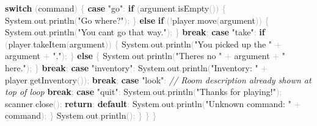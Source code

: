 \documentclass[
  justified,
  openright,
]{tufte-book}
\newcommand{\KeywordTok}[1]{\textcolor{CodeKeyword}{\textbf{#1}}}  %
\newcommand{\StringTok}[1]{\textcolor{CodeString}{#1}}              %
\newcommand{\CommentTok}[1]{\textcolor{CodeComment}{\textit{#1}}}  %
\newcommand{\CodeFuncTok}[1]{\textcolor{CodeKeyword}{#1}}           %
\newcommand{\OperatorTok}[1]{\textcolor{DarkGray}{#1}}              %
\newenvironment{Shaded}{%
  \begin{mdframed}[style=TufteCode]%
}{%
  \end{mdframed}%
}
\begin{document}
\begin{Shaded}
\begin{Highlighting}[]
            \KeywordTok{switch} \OperatorTok{(}command\OperatorTok{)} \OperatorTok{\{}
                \KeywordTok{case} \StringTok{"go"}\OperatorTok{:}
                    \KeywordTok{if} \OperatorTok{(}argument\OperatorTok{.}\CodeFuncTok{isEmpty}\OperatorTok{())} \OperatorTok{\{}
                        System\OperatorTok{.}\CodeFuncTok{out}\OperatorTok{.}\CodeFuncTok{println}\OperatorTok{(}\StringTok{"Go where?"}\OperatorTok{);}
                    \OperatorTok{\}} \KeywordTok{else} \KeywordTok{if} \OperatorTok{(!}player\OperatorTok{.}\CodeFuncTok{move}\OperatorTok{(}argument\OperatorTok{))} \OperatorTok{\{}
                        System\OperatorTok{.}\CodeFuncTok{out}\OperatorTok{.}\CodeFuncTok{println}\OperatorTok{(}\StringTok{"You can\textquotesingle{}t go that way."}\OperatorTok{);}
                    \OperatorTok{\}}
                    \KeywordTok{break}\OperatorTok{;}
                \KeywordTok{case} \StringTok{"take"}\OperatorTok{:}
                    \KeywordTok{if} \OperatorTok{(}player\OperatorTok{.}\CodeFuncTok{takeItem}\OperatorTok{(}argument\OperatorTok{))} \OperatorTok{\{}
                        System\OperatorTok{.}\CodeFuncTok{out}\OperatorTok{.}\CodeFuncTok{println}\OperatorTok{(}\StringTok{"You picked up the "} \OperatorTok{+} argument \OperatorTok{+} \StringTok{"."}\OperatorTok{);}
                    \OperatorTok{\}} \KeywordTok{else} \OperatorTok{\{}
                        System\OperatorTok{.}\CodeFuncTok{out}\OperatorTok{.}\CodeFuncTok{println}\OperatorTok{(}\StringTok{"There\textquotesingle{}s no "} \OperatorTok{+} argument \OperatorTok{+} \StringTok{" here."}\OperatorTok{);}
                    \OperatorTok{\}}
                    \KeywordTok{break}\OperatorTok{;}
                \KeywordTok{case} \StringTok{"inventory"}\OperatorTok{:}
                    System\OperatorTok{.}\CodeFuncTok{out}\OperatorTok{.}\CodeFuncTok{println}\OperatorTok{(}\StringTok{"Inventory: "} \OperatorTok{+} player\OperatorTok{.}\CodeFuncTok{getInventory}\OperatorTok{());}
                    \KeywordTok{break}\OperatorTok{;}
                \KeywordTok{case} \StringTok{"look"}\OperatorTok{:}
                    \CommentTok{// Room description already shown at top of loop}
                    \KeywordTok{break}\OperatorTok{;}
                \KeywordTok{case} \StringTok{"quit"}\OperatorTok{:}
                    System\OperatorTok{.}\CodeFuncTok{out}\OperatorTok{.}\CodeFuncTok{println}\OperatorTok{(}\StringTok{"Thanks for playing!"}\OperatorTok{);}
                    scanner\OperatorTok{.}\CodeFuncTok{close}\OperatorTok{();}
                    \KeywordTok{return}\OperatorTok{;}
                \KeywordTok{default}\OperatorTok{:}
                    System\OperatorTok{.}\CodeFuncTok{out}\OperatorTok{.}\CodeFuncTok{println}\OperatorTok{(}\StringTok{"Unknown command: "} \OperatorTok{+} command\OperatorTok{);}
            \OperatorTok{\}}
            System\OperatorTok{.}\CodeFuncTok{out}\OperatorTok{.}\CodeFuncTok{println}\OperatorTok{();}
        \OperatorTok{\}}
    \OperatorTok{\}}
\OperatorTok{\}}
\end{Highlighting}
\end{Shaded}
\end{document}

